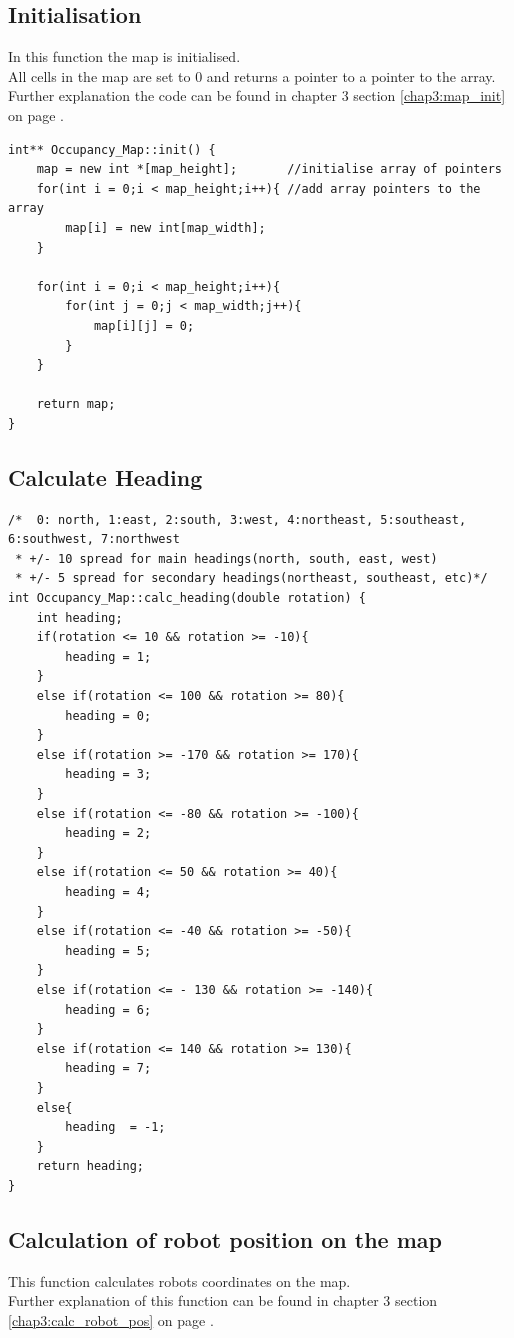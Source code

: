 \subsection{Initialisation}
\label{code:map_init}
In this function the map is initialised.\\
All cells in the map are set to 0 and returns a pointer to a pointer to the array. 
Further explanation the code can be found in chapter 3 section \ref{chap3:map_init} on page \pageref{chap3:map_init}. 
\begin{lstlisting}[caption = {Map initialisation}]
int** Occupancy_Map::init() {
    map = new int *[map_height];       //initialise array of pointers
    for(int i = 0;i < map_height;i++){ //add array pointers to the array
        map[i] = new int[map_width];
    }

    for(int i = 0;i < map_height;i++){
        for(int j = 0;j < map_width;j++){
            map[i][j] = 0;
        }
    }

    return map;
}
\end{lstlisting}

\subsection{Calculate Heading}
\label{code:calc_heading}

\begin{lstlisting}[caption = {Calculate the robots heading}]
/*  0: north, 1:east, 2:south, 3:west, 4:northeast, 5:southeast, 6:southwest, 7:northwest
 * +/- 10 spread for main headings(north, south, east, west)
 * +/- 5 spread for secondary headings(northeast, southeast, etc)*/
int Occupancy_Map::calc_heading(double rotation) {
    int heading;
    if(rotation <= 10 && rotation >= -10){
        heading = 1;
    }
    else if(rotation <= 100 && rotation >= 80){
        heading = 0;
    }
    else if(rotation >= -170 && rotation >= 170){
        heading = 3;
    }
    else if(rotation <= -80 && rotation >= -100){
        heading = 2;
    }
    else if(rotation <= 50 && rotation >= 40){
        heading = 4;
    }
    else if(rotation <= -40 && rotation >= -50){
        heading = 5;
    }
    else if(rotation <= - 130 && rotation >= -140){
        heading = 6;
    }
    else if(rotation <= 140 && rotation >= 130){
        heading = 7;
    }
    else{
        heading  = -1;
    }
    return heading;
}
\end{lstlisting}

\subsection{Calculation of robot position on the map}
\label{code:calc_robot_pos}
This function calculates robots coordinates on the map. \\
Further explanation of this function can be found in chapter 3 section \ref{chap3:calc_robot_pos} on page \pageref{chap3:calc_robot_pos}.

